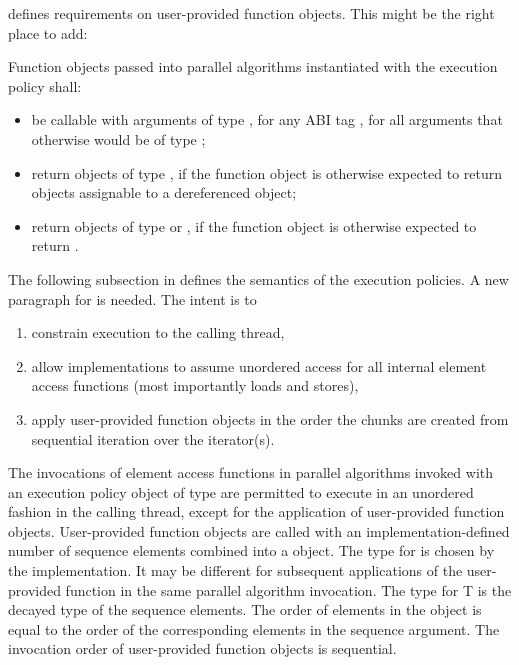 \bigskip
\citep[§25.3.2]{N4842} defines requirements on user-provided function objects.
This might be the right place to add:
\begin{wgText}
  \setcounter{Paras}{1}
  \color{WgAdd}
  \pnum Function objects passed into parallel algorithms instantiated with the \simdEP execution policy shall:
  \begin{itemize}
    \item be callable with arguments of type , for any ABI tag , for all arguments that otherwise would be of type ;
    \item return objects of type , if the function object is otherwise expected to return objects assignable to a dereferenced  object;
    \item return objects of type  or \bool, if the function object is otherwise expected to return \bool.
  \end{itemize}
\end{wgText}

The following subsection in \citep[§25.3.3]{N4842} defines the semantics of the execution policies.
A new paragraph for \simdEP is needed.
The intent is to
\begin{enumerate}
  \item constrain execution to the calling thread,
  \item allow implementations to assume unordered access for all internal element access functions (most importantly loads and stores),
  \item apply user-provided function objects in the order the \simd chunks are created from sequential iteration over the iterator(s).
\end{enumerate}
\begin{wgText}
  \setcounter{Paras}{7}%
  \color{WgAdd}
  \pnum
  The invocations of element access functions in parallel algorithms invoked with an execution policy object of type \simdEPT are permitted to execute in an unordered fashion in the calling thread, except for the application of user-provided function objects.
  User-provided function objects are called with an im\-ple\-men\-ta\-tion-defined number of sequence elements combined into a \simd[<T, Abi>] object.
  The type for  is chosen by the implementation.
  It may be different for subsequent applications of the user-provided function in the same parallel algorithm invocation.
  The type for \type T is the decayed type of the sequence elements.
  The order of elements in the \simd object is equal to the order of the corresponding elements in the sequence argument.
  The invocation order of user-provided function objects is sequential.
\end{wgText}

